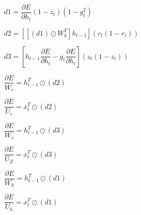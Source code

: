 \begin{center}
    $d1 = \dfrac{\partial E}{\partial h_t} (1-z_t) (1-g_t^2)$
    
    $d2 = [ [ ( d1 ) \odot W_h^T] h_{t-1}] (r_t(1-r_t))$

    $d3 = [h_{t-1}\dfrac{\partial E}{\partial h_t} - g_t\dfrac{\partial E}{\partial h_t}](z_t(1-z_t))$

    $\dfrac{\partial E}{W_r} = h_{t-1}^T \odot (d2)$

    $\dfrac{\partial E}{U_r} = x_t^T \odot (d2)$

    $\dfrac{\partial E}{W_z} = h_{t-1}^T \odot (d3)$

    $\dfrac{\partial E}{U_Z} = x_t^T \odot (d3)$

    $\dfrac{\partial E}{W_h} = h_{t-1}^T \odot (d1)$

    $\dfrac{\partial E}{U_h} = x_t^T \odot (d1)$
\end{center}





